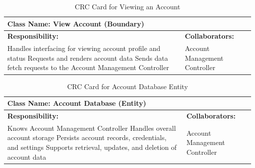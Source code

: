 \documentclass[]{article}
\begin{document}
\begin{table}[H]
    \centering
    \caption{CRC Card for Viewing an Account}
    \vspace{1mm}
    \begin{tabular}{|p{7.5cm}|p{7.5cm}|}
    \hline 
    \multicolumn{2}{|l|}{\textbf{Class Name: View Account (Boundary)}} \\
    \hline
    \textbf{Responsibility:} & \textbf{Collaborators:} \\
    \hline
        Handles interfacing for viewing account profile and status \newline
        Requests and renders account data \newline
        Sends data fetch requests to the Account Management Controller \newline
        &
        Account Management Controller \\
    \hline
    \end{tabular}
\end{table}
\begin{table}[H]
    \centering
    \caption{CRC Card for Account Database Entity}
    \vspace{1mm}
    \begin{tabular}{|p{7.5cm}|p{7.5cm}|}
    \hline 
    \multicolumn{2}{|l|}{\textbf{Class Name: Account Database (Entity)}} \\
    \hline
    \textbf{Responsibility:} & \textbf{Collaborators:} \\
    \hline
        Knows Account Management Controller \newline
        Handles overall account storage \newline
        Persists account records, credentials, and settings \newline
        Supports retrieval, updates, and deletion of account data \newline
        &
        Account Management Controller \\
    \hline
    \end{tabular}
\end{table}
\end{document}
